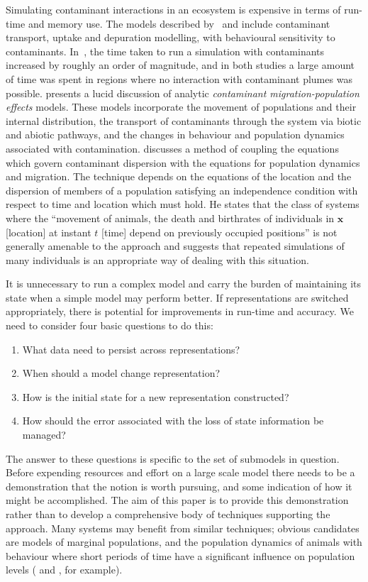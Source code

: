 Simulating contaminant interactions in an ecosystem is expensive in terms of
run-time and memory use. The models described by~\citeauthor{gray2006nws} and
\citeauthor{Lyne94:1} include contaminant transport, uptake and depuration
modelling, with behavioural sensitivity to contaminants. In~\citeauthor{gray2006nws},
the time taken to run a simulation with contaminants increased by roughly an
order of magnitude, and in both studies a large amount of time was spent in
regions where no interaction with contaminant plumes was possible.
\citet{Monte09:1} presents a lucid discussion of analytic {\em{contaminant
migration-population effects}\/} models. These models incorporate the movement
of populations and their internal distribution, the transport of contaminants
through the system via biotic and abiotic pathways, and the changes in
behaviour and population dynamics associated with contamination.
 discusses a method of coupling the equations which govern
contaminant dispersion with the equations for population dynamics and
migration. The technique depends on the equations of the location and the
dispersion of members of a population satisfying an independence condition
with respect to time and location which must hold. He states that the class of
systems where the ``movement of animals, the death and birthrates of
individuals in $\mathbf{x}$ [location] at instant $t$ [time] depend on
previously occupied positions'' is not generally amenable to the approach and
suggests that repeated simulations of many individuals is an appropriate way
of dealing with this situation.

It is unnecessary to run a complex model and carry the burden of maintaining
its state when a simple model may perform better. If representations are
switched appropriately, there is potential for improvements in run-time and
accuracy. We need to consider four basic questions to do this:
\begin{enumerate}
  \item What data need to persist across representations?\label{Q1}
  
  \item When should a model change representation?\label{Q2}
  
  \item How is the initial state for a new representation
  constructed?\label{Q3}
  
  \item How should the error associated with the loss of state information be
  managed?\label{Q4}
\end{enumerate}
The answer to these questions is specific to the set of submodels in question.
Before expending resources and effort on a large scale model there needs to be
a demonstration that the notion is worth pursuing, and some indication of how
it might be accomplished. The aim of this paper is to provide this
demonstration rather than to develop a comprehensive body of techniques
supporting the approach. Many systems may benefit from similar techniques;
obvious candidates are models of marginal populations, and the population
dynamics of animals with behaviour where short periods of time have a
significant influence on population levels (\citet{Wolff94:1} and
\citet{Elderd08:1}, for example).

